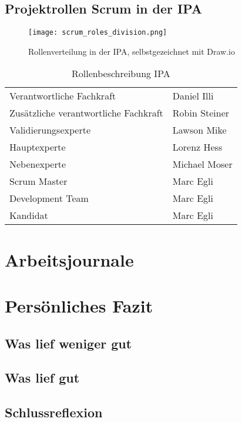 \newpage

\section{Projektrollen Scrum in der IPA}

\begin{figure}[h]
    \centering
    \texttt{[image: scrum\_roles\_division.png]}
    \caption{Rollenverteilung in der IPA, selbstgezeichnet mit Draw.io}
\end{figure}

\begin{table}[h!]
    \begin{tabular}{|L{0.4\textwidth}|L{0.5\textwidth}|}
        \hline
          \\[12pt]
        \hline
        Verantwortliche Fachkraft & Daniel Illi  \\
        \hline
        Zusätzliche verantwortliche Fachkraft & Robin Steiner \\
        \hline
        Validierungsexperte & Lawson Mike \\ 
        \hline
        Hauptexperte & Lorenz Hess \\ 
        \hline
        Nebenexperte & Michael Moser \\ 
        \hline
        Scrum Master & Marc Egli \\ 
        \hline
        Development Team & Marc Egli \\ 
        \hline
        Kandidat & Marc Egli \\ 
        \hline
      \end{tabular}
      \caption{Rollenbeschreibung IPA}
\end{table}



\chapter{Arbeitsjournale}













\chapter{Persönliches Fazit}

\section{Was lief weniger gut}

\section{Was lief gut}

\section{Schlussreflexion}